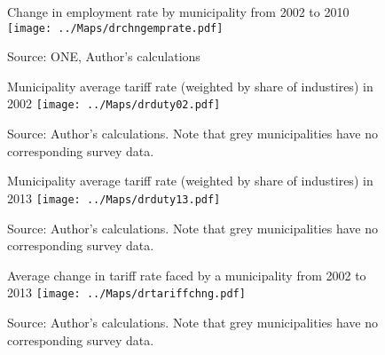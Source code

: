 \begin{landscape}
\begin{figure}[H]
\centering
Change in employment rate by municipality from 2002 to 2010
\texttt{[image: ../Maps/drchngemprate.pdf]}
\caption{\label{fig:Map6}}
Source: ONE, Author's calculations
\end{figure}

\begin{figure}[H]
\centering
Municipality average tariff rate (weighted by share of industires) in 2002
\texttt{[image: ../Maps/drduty02.pdf]}
\caption{\label{fig:Map1}}
Source: Author's calculations. Note that grey municipalities have no corresponding survey data.
\end{figure}

\begin{figure}[H]
\centering
Municipality average tariff rate (weighted by share of industires) in 2013
\texttt{[image: ../Maps/drduty13.pdf]}
\caption{\label{fig:Map2}}
Source: Author's calculations. Note that grey municipalities have no corresponding survey data.
\end{figure}

\begin{figure}[H]
\centering
Average change in tariff rate faced by a municipality from 2002 to 2013
\texttt{[image: ../Maps/drtariffchng.pdf]}
\caption{\label{fig:Map3}}
Source: Author's calculations. Note that grey municipalities have no corresponding survey data.
\end{figure}
\end{landscape}